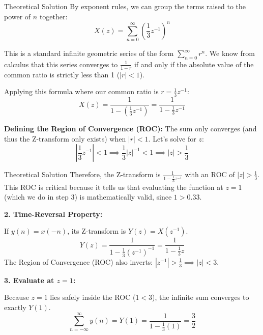 \documentclass{beamer}
\begin{document}
\begin{frame}{Theoretical Solution}
By exponent rules, we can group the terms raised to the power of $n$ together:
\begin{equation}
X(z) = \sum_{n=0}^{\infty} \left(\frac{1}{3} z^{-1}\right)^n
\end{equation}

This is a standard infinite geometric series of the form $\sum_{n=0}^{\infty} r^n$. We know from calculus that this series converges to $\frac{1}{1-r}$ if and only if the absolute value of the common ratio is strictly less than 1 ($|r| < 1$). 

Applying this formula where our common ratio is $r = \frac{1}{3} z^{-1}$:
\begin{equation}
X(z) = \frac{1}{1 - \left(\frac{1}{3} z^{-1}\right)} = \frac{1}{1 - \frac{1}{3}z^{-1}}
\end{equation}

\textbf{Defining the Region of Convergence (ROC):}
The sum only converges (and thus the Z-transform only exists) when $|r| < 1$. Let's solve for $z$:
\begin{equation}
\left| \frac{1}{3} z^{-1} \right| < 1 \implies \frac{1}{3} |z|^{-1} < 1 \implies |z| > \frac{1}{3}
\end{equation}


\end{frame}
\begin{frame}{Theoretical Solution}
Therefore, the Z-transform is $\frac{1}{1 - \frac{1}{3}z^{-1}}$ with an ROC of $|z| > \frac{1}{3}$. This ROC is critical because it tells us that evaluating the function at $z=1$ (which we do in step 3) is mathematically valid, since $1 > 0.33$.

\textbf{2. Time-Reversal Property:}

If $y(n) = x(-n)$, its Z-transform is $Y(z) = X(z^{-1})$.
\begin{equation}
Y(z) = \frac{1}{1 - \frac{1}{3}(z^{-1})^{-1}} = \frac{1}{1 - \frac{1}{3}z}
\end{equation}
The Region of Convergence (ROC) also inverts: $|z^{-1}| > \frac{1}{3} \implies |z| < 3$.

\textbf{3. Evaluate at $z=1$:}

Because $z=1$ lies safely inside the ROC ($1 < 3$), the infinite sum converges to exactly $Y(1)$.
\begin{equation}
\sum_{n=-\infty}^{\infty} y(n) = Y(1) = \frac{1}{1 - \frac{1}{3}(1)} =  \frac{3}{2}
\end{equation}
\end{frame}
\end{document}
